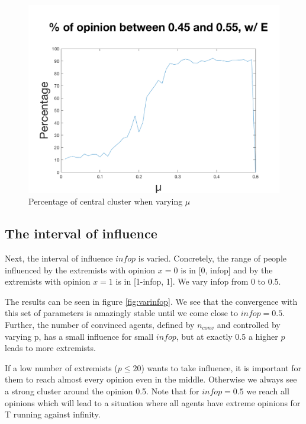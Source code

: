 \documentclass[11pt]{article}
\begin{document}
\begin{figure}[!htb]
\center
  \includegraphics[width=0.7\linewidth]{gen_plot_intervall_2017121721201994207e+01.png}
  \caption{Percentage of central cluster when varying $\mu$}
  \label{fig:uwitextremists}
\end{figure}

\subsection{The interval of influence}
Next, the interval of influence $infop$ is varied. Concretely, the range of people influenced by the extremists with opinion $x=0$ is in [0, infop] and by the extremists with opinion $x=1$ is in [1-infop, 1]. We vary infop from 0 to 0.5. 

The results can be seen in figure \ref{fig:varinfop}. We see that the convergence with this set of parameters is amazingly stable until we come close to $infop = 0.5$. Further, the number of convinced agents, defined by $n_{conv}$ and controlled by varying p, has a small influence for small $infop$, but at exactly 0.5 a higher $p$ leads to more extremists.

If a low number of extremists ($p \leq 20$) wants to take influence, it is important for them to reach almost every opinion even in the middle. Otherwise we always see a strong cluster around the opinion 0.5. Note that for $infop = 0.5$ we reach all opinions which will lead to a situation where all agents have extreme opinions for T running against infinity.
\end{document}
